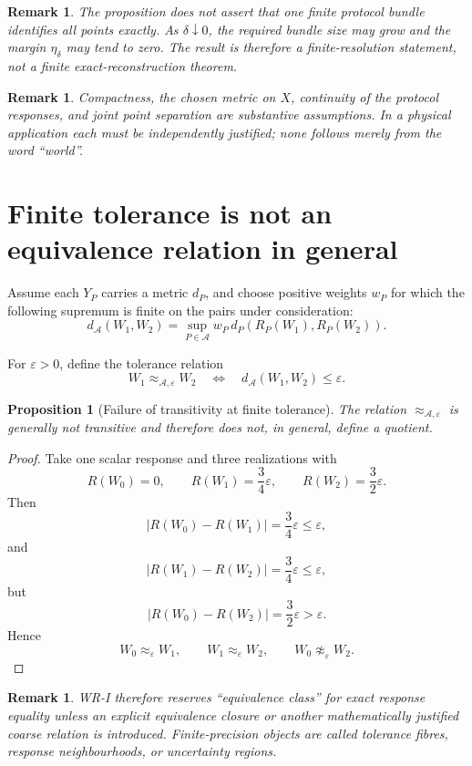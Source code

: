 \documentclass[11pt]{article}
\newtheorem{proposition}[definition]{Proposition}
\newtheorem{remark}[definition]{Remark}
\newcommand{\Acal}{\mathcal A}
\begin{document}
\begin{remark}
The proposition does not assert that one finite protocol bundle identifies all
points exactly.  As $\delta\downarrow0$, the required bundle size may grow and
the margin $\eta_\delta$ may tend to zero.  The result is therefore a
finite-resolution statement, not a finite exact-reconstruction theorem.
\end{remark}

\begin{remark}
Compactness, the chosen metric on $X$, continuity of the protocol responses,
and joint point separation are substantive assumptions.  In a physical
application each must be independently justified; none follows merely from the
word ``world''.
\end{remark}


\section{Finite tolerance is not an equivalence relation in general}

Assume each $Y_P$ carries a metric $d_P$, and choose positive weights $w_P$ for
which the following supremum is finite on the pairs under consideration:
\[
d_{\Acal}(W_1,W_2)
=
\sup_{P\in\Acal}
w_P\,d_P(R_P(W_1),R_P(W_2)).
\]

For $\varepsilon>0$, define the tolerance relation
\[
W_1\approx_{\Acal,\varepsilon}W_2
\quad\Longleftrightarrow\quad
d_{\Acal}(W_1,W_2)\le\varepsilon.
\]

\begin{proposition}[Failure of transitivity at finite tolerance]
The relation $\approx_{\Acal,\varepsilon}$ is generally not transitive and
therefore does not, in general, define a quotient.
\end{proposition}

\begin{proof}
Take one scalar response and three realizations with
\[
R(W_0)=0,\qquad
R(W_1)=\frac{3}{4}\varepsilon,\qquad
R(W_2)=\frac{3}{2}\varepsilon.
\]
Then
\[
|R(W_0)-R(W_1)|=\frac34\varepsilon\le\varepsilon,
\]
and
\[
|R(W_1)-R(W_2)|=\frac34\varepsilon\le\varepsilon,
\]
but
\[
|R(W_0)-R(W_2)|=\frac32\varepsilon>\varepsilon.
\]
Hence
\[
W_0\approx_{\varepsilon}W_1,\qquad
W_1\approx_{\varepsilon}W_2,\qquad
W_0\not\approx_{\varepsilon}W_2.
\]
\end{proof}

\begin{remark}
WR-I therefore reserves ``equivalence class'' for exact response equality unless
an explicit equivalence closure or another mathematically justified coarse
relation is introduced.  Finite-precision objects are called tolerance fibres,
response neighbourhoods, or uncertainty regions.
\end{remark}
\end{document}
